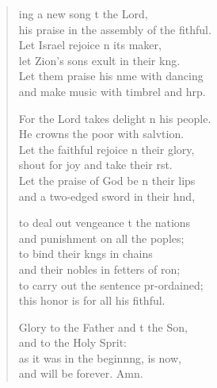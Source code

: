 \settowidth{\versewidth}{his praise in the assembly of the faithful.}
\begin{verse}%
  \begin{patverse}
    ing a new song t the Lord,\Med\\
his praise in the assembly of the fithful.\\
Let Israel rejoice \pointup{\i}n its maker,\Med\\
let Zion’s sons exult in their k\pointup{\i}ng.\\
Let them praise his nme with dancing\Med\\
and make music with timbrel and hrp.

For the Lord takes delight \pointup{\i}n his people.\Med\\
He crowns the poor with salvtion.\\
Let the faithful rejoice \pointup{\i}n their glory,\Med\\
shout for joy and take their rst.\\
Let the praise of God be n their lips\Med\\
and a two-edged sword in their hnd,

to deal out vengeance t the nations\Med\\
and punishment on all the poples;\\
to bind their k\pointup{\i}ngs in chains\Med\\
and their nobles in fetters of \pointup{\i}ron;\\
to carry out the sentence pr-ordained;\Med\\
this honor is for all his fithful.

Glory to the Father and t the Son,\Med\\
and to the Holy Sp\pointup{\i}rit:\\
as it was in the beginn\pointup{\i}ng, is now,\Med\\
and will be forever. Amn.
  \end{patverse}
\end{verse}
